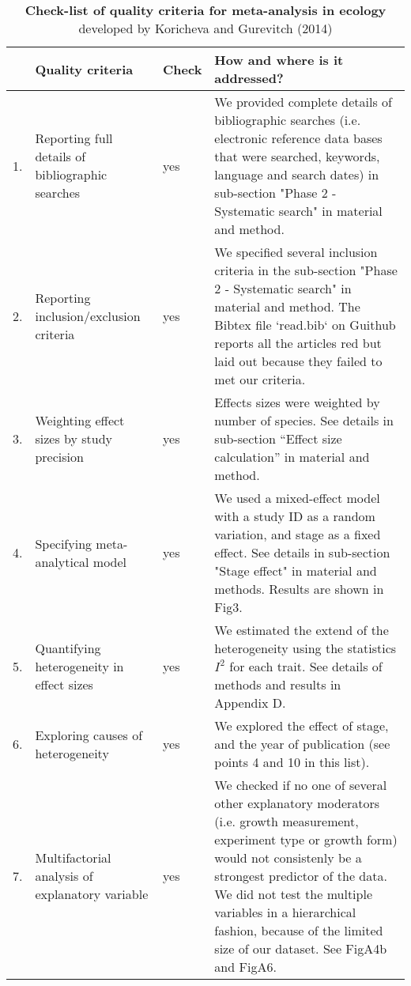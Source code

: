 \documentclass[a4paper,11pt]{article}
\begin{document}
\clearpage
\begin{table}[h!]
\centering
\caption{\textbf{Check-list of quality criteria for meta-analysis in ecology} developed by Koricheva and Gurevitch (2014) }
{\footnotesize
\vspace{0.5cm}
\begin{tabular}{p{0.2cm}p{5cm}p{0.8cm}p{9cm}}
  \hline
  & Quality criteria & Check & How and where is it addressed? \\
  \hline
  1.& Reporting full details of bibliographic searches & yes	& We provided complete details of bibliographic searches (i.e. electronic reference data bases that were searched, keywords, language and search dates) in sub-section "Phase 2 - Systematic search" in material and method.\\
  2.& Reporting inclusion/exclusion criteria & yes & We specified several inclusion criteria in the sub-section "Phase 2 - Systematic search" in material and method. The Bibtex file `read.bib` on Guithub reports all the articles red but laid out because they failed to met our criteria.\\
  3.& Weighting effect sizes by study precision & yes & Effects sizes were weighted by number of species. See	 details in sub-section ``Effect size calculation'' in material and method.\\
 4.& Specifying meta-analytical model &	yes	& We used a mixed-effect model with a study ID as a random variation, and stage as a fixed effect. See details in sub-section "Stage effect" in material and methods. Results are shown in Fig3.\\
 5.& Quantifying heterogeneity in effect sizes &	yes &	We estimated the extend of the heterogeneity using the statistics $I^{2}$ for each trait. See details of methods and results in Appendix D.\\
 6.& Exploring causes of heterogeneity & yes &	We explored the effect of stage, and the year of publication (see points 4 and 10 in this list). \\
 7.& Multifactorial analysis of explanatory variable	& yes & We checked if no one of several other explanatory moderators (i.e. growth measurement, experiment type or growth form) would not consistenly be a strongest predictor of the data. We did not test the multiple variables in a hierarchical fashion, because of the limited size of our dataset. See FigA4b and FigA6.\\

\end{tabular}}
\end{table}
\end{document}
